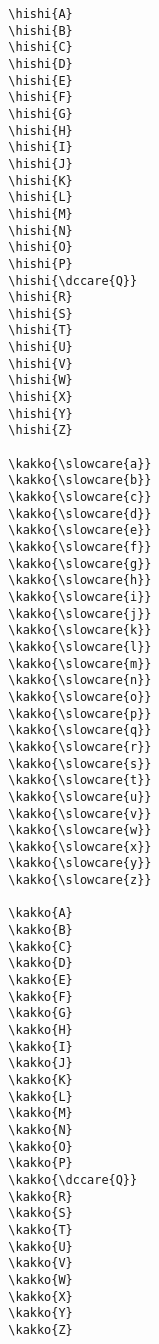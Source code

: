 \documentclass[luatex,fontsize=10pt,paper=b5,twoside]{jlreq}%
\begin{document}
\begin{lstlisting}
  \hishi{A}
  \hishi{B}
  \hishi{C}
  \hishi{D}
  \hishi{E}
  \hishi{F}
  \hishi{G}
  \hishi{H}
  \hishi{I}
  \hishi{J}
  \hishi{K}
  \hishi{L}
  \hishi{M}
  \hishi{N}
  \hishi{O}
  \hishi{P}
  \hishi{\dccare{Q}}
  \hishi{R}
  \hishi{S}
  \hishi{T}
  \hishi{U}
  \hishi{V}
  \hishi{W}
  \hishi{X}
  \hishi{Y}
  \hishi{Z}

  \kakko{\slowcare{a}}
  \kakko{\slowcare{b}}
  \kakko{\slowcare{c}}
  \kakko{\slowcare{d}}
  \kakko{\slowcare{e}}
  \kakko{\slowcare{f}}
  \kakko{\slowcare{g}}
  \kakko{\slowcare{h}}
  \kakko{\slowcare{i}}
  \kakko{\slowcare{j}}
  \kakko{\slowcare{k}}
  \kakko{\slowcare{l}}
  \kakko{\slowcare{m}}
  \kakko{\slowcare{n}}
  \kakko{\slowcare{o}}
  \kakko{\slowcare{p}}
  \kakko{\slowcare{q}}
  \kakko{\slowcare{r}}
  \kakko{\slowcare{s}}
  \kakko{\slowcare{t}}
  \kakko{\slowcare{u}}
  \kakko{\slowcare{v}}
  \kakko{\slowcare{w}}
  \kakko{\slowcare{x}}
  \kakko{\slowcare{y}}
  \kakko{\slowcare{z}}

  \kakko{A}
  \kakko{B}
  \kakko{C}
  \kakko{D}
  \kakko{E}
  \kakko{F}
  \kakko{G}
  \kakko{H}
  \kakko{I}
  \kakko{J}
  \kakko{K}
  \kakko{L}
  \kakko{M}
  \kakko{N}
  \kakko{O}
  \kakko{P}
  \kakko{\dccare{Q}}
  \kakko{R}
  \kakko{S}
  \kakko{T}
  \kakko{U}
  \kakko{V}
  \kakko{W}
  \kakko{X}
  \kakko{Y}
  \kakko{Z}
\end{lstlisting}



\end{document}

